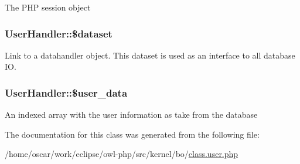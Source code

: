 The PHP session object \hypertarget{classUserHandler_c38c1ea50b2820ed03781bdbe8eb2e08}{
\subsubsection{\setlength{\rightskip}{0pt plus 5cm}UserHandler::\$dataset}}
\label{classUserHandler_c38c1ea50b2820ed03781bdbe8eb2e08}


Link to a datahandler object. This dataset is used as an interface to all database IO. \hypertarget{classUserHandler_e7a2d59eee65560ac96b860e828bb445}{
\subsubsection{\setlength{\rightskip}{0pt plus 5cm}UserHandler::\$user\_\-data}}
\label{classUserHandler_e7a2d59eee65560ac96b860e828bb445}


An indexed array with the user information as take from the database 

The documentation for this class was generated from the following file:\begin{CompactItemize}
\item 
/home/oscar/work/eclipse/owl-php/src/kernel/bo/\hyperlink{class_8user_8php}{class.user.php}\end{CompactItemize}

